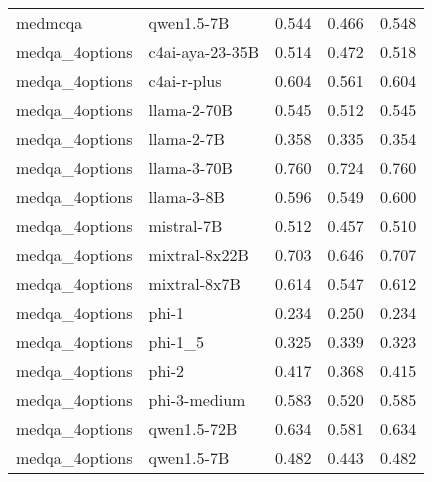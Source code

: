 \begin{tabular}{llrrr}
medmcqa & qwen1.5-7B & 0.544 & 0.466 & 0.548 \\
medqa_4options & c4ai-aya-23-35B & 0.514 & 0.472 & 0.518 \\
medqa_4options & c4ai-r-plus & 0.604 & 0.561 & 0.604 \\
medqa_4options & llama-2-70B & 0.545 & 0.512 & 0.545 \\
medqa_4options & llama-2-7B & 0.358 & 0.335 & 0.354 \\
medqa_4options & llama-3-70B & 0.760 & 0.724 & 0.760 \\
medqa_4options & llama-3-8B & 0.596 & 0.549 & 0.600 \\
medqa_4options & mistral-7B & 0.512 & 0.457 & 0.510 \\
medqa_4options & mixtral-8x22B & 0.703 & 0.646 & 0.707 \\
medqa_4options & mixtral-8x7B & 0.614 & 0.547 & 0.612 \\
medqa_4options & phi-1 & 0.234 & 0.250 & 0.234 \\
medqa_4options & phi-1_5 & 0.325 & 0.339 & 0.323 \\
medqa_4options & phi-2 & 0.417 & 0.368 & 0.415 \\
medqa_4options & phi-3-medium & 0.583 & 0.520 & 0.585 \\
medqa_4options & qwen1.5-72B & 0.634 & 0.581 & 0.634 \\
medqa_4options & qwen1.5-7B & 0.482 & 0.443 & 0.482 \\
\bottomrule
\end{tabular}
